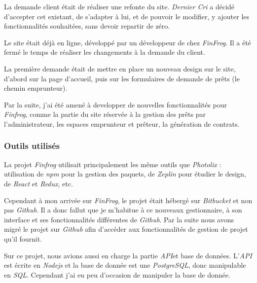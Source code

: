 \bigskip
La demande client était de réaliser une refonte du site. \emph{Dernier
Cri} a décidé d'accepter cet existant, de s'adapter à lui, et de pouvoir
le modifier, y ajouter les fonctionnalités souhaitées, sans devoir
repartir de zéro.

\bigskip

Le site était déjà en ligne, développé par un développeur de chez
\emph{FinFrog}. Il a été fermé le temps de réaliser les changements à la
demande du client.

\bigskip

La première demande était de mettre en place un nouveau design sur le
site, d'abord sur la page d'accueil, puis sur les formulaires de demande
de prêts (le chemin emprunteur).

\bigskip

Par la suite, j'ai été amené à developper de nouvelles fonctionnalités
pour \emph{Finfrog}, comme la partie du site réservée à la gestion des
prêts par l'administrateur, les espaces emprunteur et prêteur, la
génération de contrats.

\bigskip

\subsubsection{Outils utilisés}\label{outils-utilisuxe9s-1}

\bigskip

La projet \emph{Finfrog} utilisait principalement les même outils que
\emph{Photolix} : utilisation de \emph{npm} pour la gestion des paquets,
de \emph{Zeplin} pour étudier le design, de \emph{React} et
\emph{Redux}, etc.

\bigskip

Cependant à mon arrivée sur \emph{FinFrog}, le projet était hébergé sur
\emph{Bitbucket} et non pas \emph{Github}. Il a donc fallut que je
m'habitue à ce nouveaux gestionnaire, à son interface et ses
fonctionnalités différentes de \emph{Github}. Par la suite nous avons
migré le projet sur \emph{Github} afin d'accéder aux fonctionnalités de
gestion de projet qu'il fournit.

\bigskip

Sur ce projet, nous avions aussi en charge la partie \emph{API}et base
de données. L'\emph{API} est écrite en \emph{Nodejs} et la base de
donnée est une \emph{PostgreSQL}, donc manipulable en \emph{SQL}.
Cependant j'ai eu peu d'occasion de manipuler la base de donnée.

\bigskip

